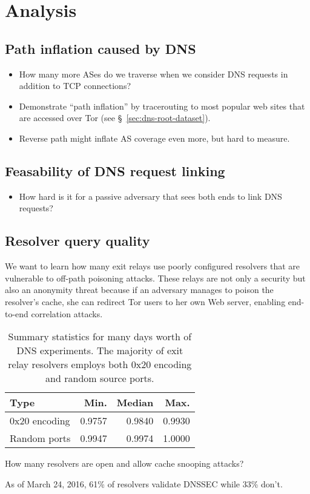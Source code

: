 \section{Analysis}
\label{sec:analysis}

\subsection{Path inflation caused by DNS}
\begin{itemize}
	\item How many more ASes do we traverse when we consider DNS requests in
		addition to TCP connections?
	\item Demonstrate ``path inflation'' by tracerouting to most popular web
		sites that are accessed over Tor (see \S~\ref{sec:dns-root-dataset}).
	\item Reverse path might inflate AS coverage even more, but hard to measure.
\end{itemize}

\subsection{Feasability of DNS request linking}
\begin{itemize}
	\item How hard is it for a passive adversary that sees both ends to link DNS
		requests?
\end{itemize}

\subsection{Resolver query quality}
We want to learn how many exit relays use poorly configured resolvers that are
vulnerable to off-path poisoning attacks.  These relays are not only a security
but also an anonymity threat because if an adversary manages to poison the
resolver's cache, she can redirect Tor users to her own Web server, enabling
end-to-end correlation attacks.

\begin{table}[t]
	\centering
	\begin{tabular}{l r r r}
	\toprule
	\textbf{Type} & \textbf{Min.} & \textbf{Median} & \textbf{Max.} \\
	\midrule
	0x20 encoding & 0.9757 & 0.9840 & 0.9930 \\
	Random ports & 0.9947 & 0.9974 & 1.0000 \\
	\bottomrule
	\end{tabular}
	\caption{Summary statistics for many days worth of DNS experiments.  The
	majority of exit relay resolvers employs both 0x20 encoding and random
	source ports.}
	\label{tab:query-quality}
\end{table}

How many resolvers are open and allow cache snooping attacks?

As of March 24, 2016, 61\% of resolvers validate DNSSEC while 33\% don't.
